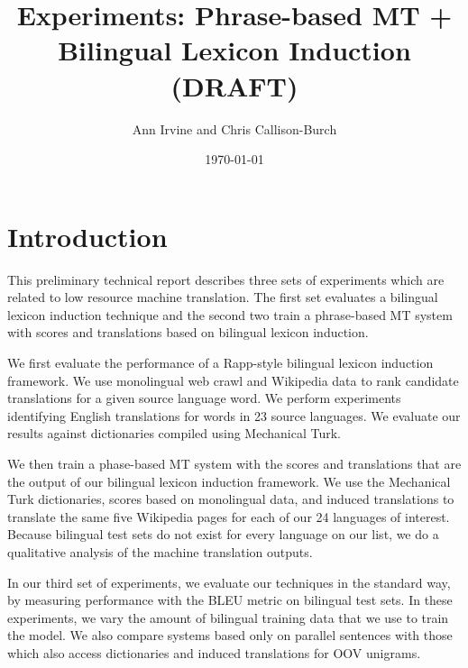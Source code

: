 \documentclass[11pt]{article}
\title{Experiments: Phrase-based MT + Bilingual Lexicon Induction (DRAFT)}
\author{Ann Irvine and Chris Callison-Burch}
\date{\today}
\begin{document}
\maketitle

\section{Introduction}
This preliminary technical report describes three sets of experiments which are related to low resource machine translation. The first set evaluates a bilingual lexicon induction technique and the second two train a phrase-based MT system with scores and translations based on bilingual lexicon induction.

We first evaluate the performance of a Rapp-style \cite{Rapp1999} bilingual lexicon induction framework. We use monolingual web crawl and Wikipedia data to rank candidate translations for a given source language word. We perform experiments identifying English translations for words in 23 source languages. We evaluate our results against dictionaries compiled using Mechanical Turk. 

We then train a phase-based MT system \cite{Moses} with the scores and translations that are the output of our bilingual lexicon induction framework. We use the Mechanical Turk dictionaries, scores based on monolingual data, and induced translations to translate the same five Wikipedia pages for each of our 24 languages of interest. Because bilingual test sets do not exist for every language on our list, we do a qualitative analysis of the machine translation outputs.

In our third set of experiments, we evaluate our techniques in the standard way, by measuring performance with the BLEU metric on bilingual test sets. In these experiments, we vary the amount of bilingual training data that we use to train the model. We also compare systems based only on parallel sentences with those which also access dictionaries and induced translations for OOV unigrams.


\end{document}
